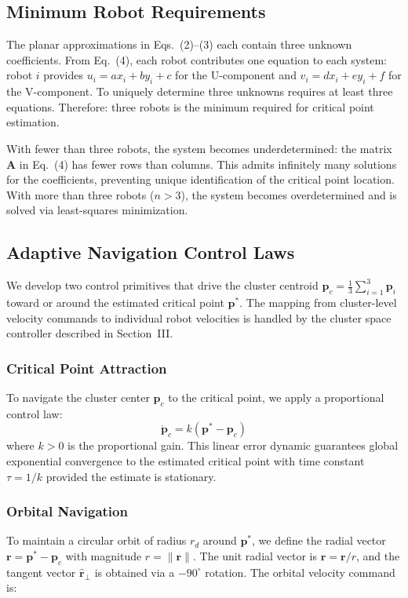 \documentclass[lettersize,journal]{IEEEtran}
\begin{document}
\subsection{Minimum Robot Requirements}

The planar approximations in Eqs.~(2)--(3) each contain three unknown coefficients. From Eq.~(4), each robot contributes one equation to each system: robot $i$ provides $u_i = ax_i + by_i + c$ for the U-component and $v_i = dx_i + ey_i + f$ for the V-component. To uniquely determine three unknowns requires at least three equations. Therefore: three robots is the minimum required for critical point estimation.

With fewer than three robots, the system becomes underdetermined: the matrix $\mathbf{A}$ in Eq.~(4) has fewer rows than columns. This admits infinitely many solutions for the coefficients, preventing unique identification of the critical point location. With more than three robots ($n > 3$), the system becomes overdetermined and is solved via least-squares minimization.


\subsection{Adaptive Navigation Control Laws}
\label{sec:control_primitives}

We develop two control primitives that drive the cluster centroid $\mathbf{p}_c = \frac{1}{3}\sum_{i=1}^{3}\mathbf{p}_i$ toward or around the estimated critical point $\mathbf{p}^*$. The mapping from cluster-level velocity commands to individual robot velocities is handled by the cluster space controller described in Section~III.

\subsubsection{Critical Point Attraction}
To navigate the cluster center $\mathbf{p}_c$ to the critical point, we apply a proportional control law:
\begin{equation}
\dot{\mathbf{p}}_c = k(\mathbf{p}^* - \mathbf{p}_c)
\end{equation}
where $k > 0$ is the proportional gain. This linear error dynamic guarantees global exponential convergence to the estimated critical point with time constant $\tau = 1/k$ provided the estimate is stationary.

\subsubsection{Orbital Navigation}
To maintain a circular orbit of radius $r_d$ around $\mathbf{p}^*$, we define the radial vector $\mathbf{r} = \mathbf{p}^* - \mathbf{p}_c$ with magnitude $r = \|\mathbf{r}\|$. The unit radial vector is $\hat{\mathbf{r}} = \mathbf{r}/r$, and the tangent vector $\hat{\mathbf{r}}_\perp$ is obtained via a $-90^\circ$ rotation. The orbital velocity command is:
\end{document}
